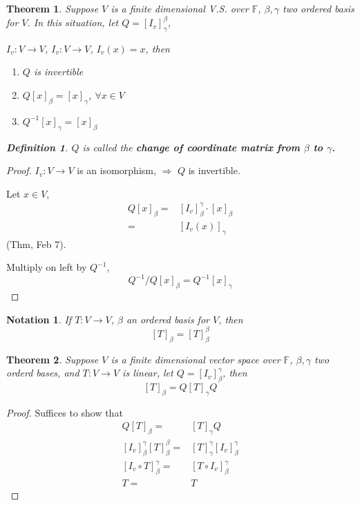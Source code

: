 \documentclass[12pt]{article}
\theoremstyle{plain}
\newtheorem{theorem}{Theorem}[subsection]
\newtheorem{definition}{Definition}[subsection]
\newtheorem{notation}{Notation}[subsection]
\newcommand{\mF}{{\mathbb{F}}}
\begin{document}
	\begin{theorem}
		Suppose $V$ is a finite dimensional V.S. over $\mF$, $\beta, \gamma$
		two ordered basis for $V$. In this situation, 
		let $Q = [I_v]^{\beta}_{\gamma}$, 

		$I_v : V \to V$, $I_v: V\to V$, $I_v(x) = x$, then 
		\begin{enumerate}
		\item $Q$ is invertible
		\item $Q[x]_{\beta} = [x]_{\gamma}$, $\forall x \in V$
		\item $Q^{-1}[x]_{\gamma} = [x]_{\beta}$
		\end{enumerate}			
		\begin{definition}
			$Q$ is called the \textbf{change of coordinate matrix from $\beta$
			to $\gamma$.}
		\end{definition}
	\end{theorem}
	\begin{proof}
		$I_v: V \to V$ is an isomorphism, $\Rightarrow$ $Q$ is invertible. 

		Let $x \in V$, 
		\begin{align*}
			Q[x]_{\beta} 
			=& [I_v]_{\beta}^{\gamma} \cdot [x]_{\beta} \\
			=& [I_v(x)]_{\gamma}
		\end{align*}
	 (Thm, Feb 7). 

		Multiply on left by $Q^{-1}$, 
		\[
			Q^{-1}/Q[x]_{\beta} = Q^{-1} [x]_{\gamma}
		\]
	\end{proof}
	
	\begin{notation}
		If $T: V\to V$, $\beta$ an ordered basis for $V$, then 
		\[
			[T]_{\beta} = [T]_{\beta}^{\beta}
		\]
	\end{notation}

	\begin{theorem}
		Suppose $V$ is a finite dimensional vector space over $\mF$, 
		$\beta, \gamma$ two orderd bases, and $T: V\to V$ is linear, 
		let $Q = [I_v]_{\beta}^{\gamma}$, then  
		\[
			[T]_{\beta} = Q[T]_{\gamma} Q
		\]
	\end{theorem}
	\begin{proof}
		Suffices to show that 
		\begin{align*}
			Q[T]_{\beta} =& [T]_{\gamma}Q \\
			[I_v]_{\beta}^{\gamma} [T]_{\beta}^{\beta} = &
			[T]_{\gamma}^{\gamma} [I_v]_{\beta}^{\gamma} \\
			[I_v\circ T] _{\beta}^{\gamma} =& [T\circ I_v]_{\beta}^{\gamma}\\
			T =& T
		\end{align*}
	\end{proof}
\end{document}
